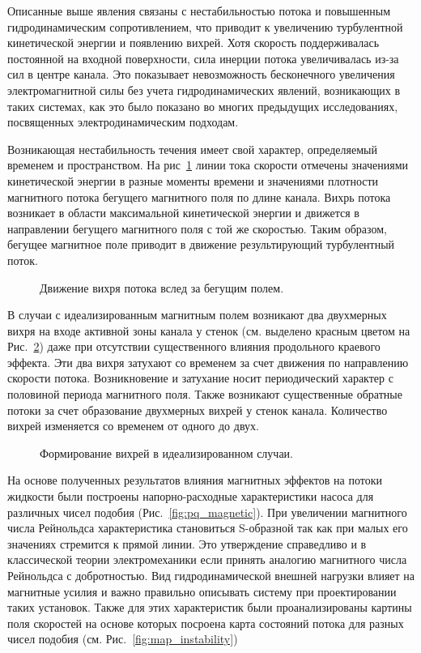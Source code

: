Описанные выше явления связаны с нестабильностью потока и повышенным гидродинамическим сопротивлением, что приводит к увеличению турбулентной кинетической энергии и появлению вихрей. Хотя скорость поддерживалась постоянной на входной поверхности, сила инерции потока увеличивалась из-за сил в центре канала. Это показывает невозможность бесконечного увеличения электромагнитной силы без учета гидродинамических явлений, возникающих в таких системах, как это было показано во многих предыдущих исследованиях, посвященных электродинамическим подходам.

Возникающая нестабильность течения имеет свой характер, определяемый временем и пространством. На рис~\ref{fig:motion_vortex} линии тока скорости отмечены значениями кинетической энергии в разные моменты времени и значениями плотности магнитного потока бегущего магнитного поля по длине канала. Вихрь потока возникает в области максимальной кинетической энергии и движется в направлении бегущего магнитного поля с той же скоростью. Таким образом, бегущее магнитное поле приводит в движение результирующий турбулентный поток. 

\begin{figure}[h]
	\caption{Движение вихря потока вслед за бегущим полем.}
	\label{fig:motion_vortex}
	
\end{figure}

В случаи с идеализированным магнитным полем возникают два двухмерных вихря на входе активной зоны канала у стенок (см. выделено красным цветом на Рис.~\ref{fig:induced_vortex}) даже при отсутствии существенного влияния продольного краевого эффекта. Эти два вихря затухают со временем за счет движения по направлению скорости потока. Возникновение и затухание носит периодический характер с половиной периода магнитного поля. Также возникают существенные обратные потоки за счет образование двухмерных вихрей у стенок канала. Количество вихрей изменяется со временем от одного до двух. 

\begin{figure}[h]
	\caption{Формирование вихрей в идеализированном случаи.}
	\label{fig:induced_vortex}
\end{figure}

На основе полученных результатов влияния магнитных эффектов на потоки жидкости были построены напорно-расходные характеристики насоса для различных чисел подобия (Рис.~\ref{fig:pq_magnetic}). При увеличении магнитного числа Рейнольдса характеристика становиться S-образной так как при малых его значениях стремится к прямой линии. Это утверждение справедливо и в классической теории электромеханики если принять аналогию магнитного числа Рейнольдса с добротностью. Вид гидродинамической внешней нагрузки влияет на магнитные усилия и важно правильно описывать систему при проектировании таких установок. Также для этих характеристик были проанализированы картины поля скоростей на основе которых посроена карта состояний потока для разных чисел подобия (см. Рис.~\ref{fig:map_instability})



